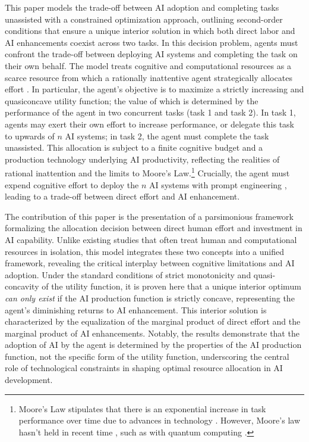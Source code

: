 This paper models the trade-off between AI adoption and completing tasks unassisted with a constrained optimization approach, outlining second-order conditions that ensure a unique interior solution in which both direct labor and AI enhancements coexist across two tasks. In this decision problem, agents must confront the trade-off between deploying AI systems and completing the task on their own behalf. The model treats cognitive and computational resources as a scarce resource from which a rationally inattentive agent strategically allocates effort \citep{sims2003implications,caplin2015revealed,dewan2020estimating,mackowiak2023rational}. In particular, the agent’s objective is to maximize a strictly increasing and quasiconcave utility function; the value of which is determined by the performance of the agent in two concurrent tasks (task 1 and task 2). In task 1, agents may exert their own effort to increase performance, or delegate this task to upwards of $n$ AI systems; in task 2, the agent must complete the task unassisted. This allocation is subject to a finite cognitive budget and a production technology underlying AI productivity, reflecting the realities of rational inattention and the limits to Moore's Law.\footnote{Moore's Law stipulates that there is an exponential increase in task performance over time due to advances in technology \citep{moore1998cramming}. However, Moore's law hasn't held in recent time \citep{waldrop2016chips}, such as with quantum computing \citep{powell2008quantum}.} Crucially, the agent must expend cognitive effort to deploy the $n$ AI systems with prompt engineering \citep{giray2023prompt}, leading to a trade-off between direct effort and AI enhancement.

The contribution of this paper is the presentation of a parsimonious framework formalizing the allocation decision between direct human effort and investment in AI capability. Unlike existing studies that often treat human and computational resources in isolation, this model integrates these two concepts into a unified framework, revealing the critical interplay between cognitive limitations and AI adoption. Under the standard conditions of strict monotonicity and quasi-concavity of the utility function, it is proven here that a unique interior optimum \textit{can only exist} if the AI production function is strictly concave, representing the agent's diminishing returns to AI enhancement. This interior solution is characterized by the equalization of the marginal product of direct effort and the marginal product of AI enhancements. Notably, the results demonstrate that the adoption of AI by the agent is determined by the properties of the AI production function, not the specific form of the utility function, underscoring the central role of technological constraints in shaping optimal resource allocation in AI development.

